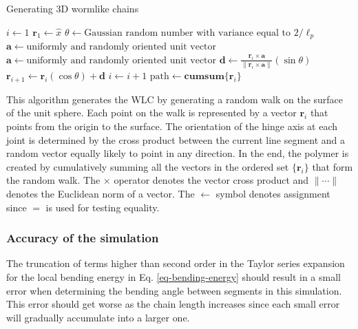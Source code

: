 \documentclass[12pt, a4paper]{article}
\begin{document}
\begin{algorithm}
  \caption{Generating 3D wormlike chains}
  \label{alg-3dWLC}
  \begin{algorithmic}[1]
    \Statex
    \State $i\gets 1$
    \State $\mathbf{r}_1\gets \hat{x}$ 
      \State $\theta\gets \text{Gaussian random number with variance equal to } 2/\ell_{p}$
      \State $\mathbf{a}\gets \text{uniformly and randomly oriented unit vector}$
      \Statex
       
        \State $\mathbf{a}\gets \text{uniformly and randomly oriented unit vector}$
      \EndWhile
    \Statex
    \State $\mathbf{d}\gets \frac{\mathbf{r}_i \times \mathbf{a}}{\lVert \mathbf{r}_i \times \mathbf{a} \rVert} \left( \sin \theta \right)$ 
    \State $\mathbf{r}_{i+1}\gets \mathbf{r}_i \left( \cos \theta \right) + \mathbf{d}$
    \State $i\gets i + 1$
    \EndWhile
    \Statex 
    \State $\text{path} \gets \mathbf{cumsum} \{ \mathbf{r}_i \}$ 
  \end{algorithmic}
\end{algorithm}

This algorithm generates the WLC by generating a random walk on the
surface of the unit sphere. Each point on the walk is represented
by a vector $\mathbf{r}_i$ that points from the origin to the
surface. The orientation of the hinge axis at each joint is
determined by the cross product between the current line segment
and a random vector equally likely to point in any direction. In
the end, the polymer is created by cumulatively summing all the
vectors in the ordered set $\{\mathbf{r}_i\}$ that form the random
walk. The $\times$ operator denotes the vector cross product and
$\lVert \cdots \rVert$ denotes the Euclidean norm of a vector. The
$\gets$ symbol denotes assignment since $=$ is used for testing
equality.

\subsubsection{Accuracy of the simulation}
\label{sec-2-2-1}
The truncation of terms higher than second order in the Taylor
series expansion for the local bending energy in
Eq. \eqref{eq-bending-energy} should result in a small error when
determining the bending angle between segments in this
simulation. This error should get worse as the chain length
increases since each small error will gradually accumulate into a
larger one.
\end{document}
